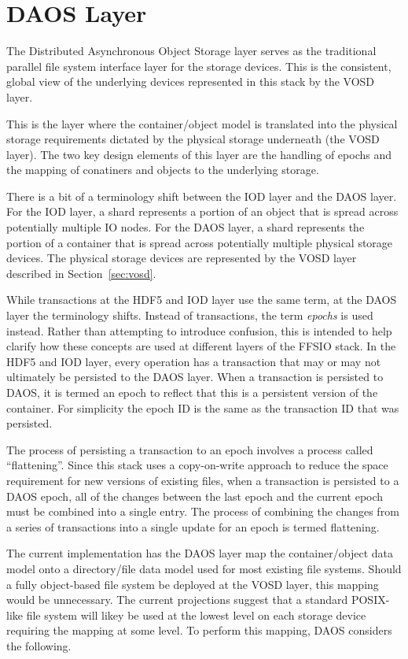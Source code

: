 \documentclass[conference]{IEEEtran}
\begin{document}
\section{DAOS Layer}
\label{sec:daos}

The Distributed Asynchronous Object Storage layer serves as the traditional
parallel file system interface layer for the storage devices. This is the
consistent, global view of the underlying devices represented in this stack
by the VOSD layer.

This is the layer where the container/object model is translated into the
physical storage requirements dictated by the physical storage underneath (the
VOSD layer). The two key design elements of this layer are the handling of
epochs and the mapping of conatiners and objects to the underlying storage.

There is a bit of a terminology shift between the IOD layer and the DAOS
layer. For the IOD layer, a shard represents a portion of an object that is
spread across potentially multiple IO nodes. For the DAOS layer, a shard
represents the portion of a container that is spread across potentially
multiple physical storage devices.  The physical storage devices are
represented by the VOSD layer described in Section~\ref{sec:vosd}.

While transactions at the HDF5 and IOD layer use the same term, at the DAOS
layer the terminology shifts. Instead of transactions, the term {\em epochs}
is used instead. Rather than attempting to introduce confusion, this is intended
to help clarify how these concepts are used at different layers of the FFSIO
stack. In the HDF5 and IOD layer, every operation has a transaction that may
or may not ultimately be persisted to the DAOS layer. When a transaction is
persisted to DAOS, it is termed an epoch to reflect that this is a persistent
version of the container. For simplicity the epoch ID is the same as the
transaction ID that was persisted.

The process of persisting a transaction to an epoch involves a process called
``flattening''. Since this stack uses a copy-on-write approach to reduce the
space requirement for new versions of existing files, when a transaction is
persisted to a DAOS epoch, all of the changes between the last epoch and the
current epoch must be combined into a single entry. The process of combining
the changes from a series of transactions into a single update for an epoch
is termed flattening.

The current implementation has the DAOS layer map the container/object data
model onto a directory/file data model used for most existing file systems.
Should a fully object-based file system be deployed at the VOSD layer, this
mapping would be unnecessary. The current projections suggest that a standard
POSIX-like file system will likey be used at the lowest level on each storage
device requiring the mapping at some level. To perform this mapping, DAOS
considers the following.
\end{document}
